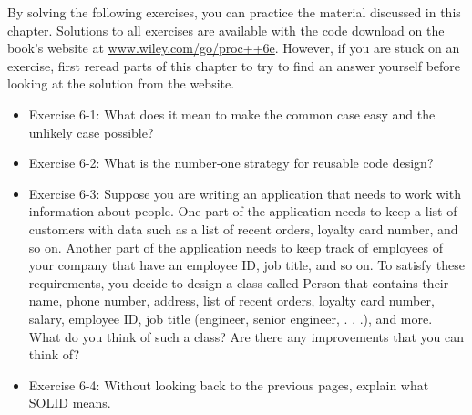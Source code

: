 By solving the following exercises, you can practice the material discussed in this chapter. Solutions to all exercises are available with the code download on the book’s website at \url{www.wiley.com/go/proc++6e}. However, if you are stuck on an exercise, first reread parts of this chapter to try to find an answer yourself before looking at the solution from the website.

\begin{itemize}
\item
Exercise 6-1: What does it mean to make the common case easy and the unlikely case possible?

\item
Exercise 6-2: What is the number-one strategy for reusable code design?

\item
Exercise 6-3: Suppose you are writing an application that needs to work with information about people. One part of the application needs to keep a list of customers with data such as a list of recent orders, loyalty card number, and so on. Another part of the application needs to keep track of employees of your company that have an employee ID, job title, and so on. To satisfy these requirements, you decide to design a class called Person that contains their name, phone number, address, list of recent orders, loyalty card number, salary, employee ID, job title (engineer, senior engineer, . . .), and more. What do you think of such a class? Are there any improvements that you can think of?

\item
Exercise 6-4: Without looking back to the previous pages, explain what SOLID means.
\end{itemize}